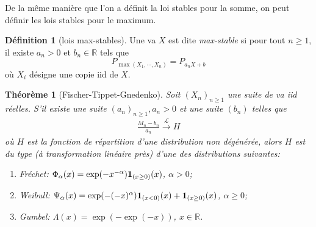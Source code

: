 \documentclass[10p,a4paper,reqno,titlepage]{report}
\newcommand{\R}{\mathbb{R}}
\newcommand{\indic}{\mathrm{{\bf 1}}}
\theoremstyle{plain}
\newtheorem{thm}[thms]{Théorème}
\theoremstyle{definition}
\newtheorem{de}[de]{Définition}
\newcommand{\cvloi}{\stackrel{\mathcal{L}}{\longrightarrow}}
\begin{document}
De la même manière que l'on a définit la loi stables pour la somme, on peut définir les lois stables pour le maximum.
\begin{de}[lois max-stables]
	Une va $X$ est dite \textit{max-stable} si pour tout $n \geq 1$, il existe $a_n >0$ et $b_n \in \R$ tels que 
	$$P_{\max(X_1,\cdots,X_n)} =P_{a_n X +b}$$
	où $X_i$ désigne une copie iid de $X$.
\end{de}
\begin{thm}[Fischer-Tippet-Gnedenko]
Soit $(X_n)_{n\geq 1}$ une suite de va iid réelles. S'il existe une suite $(a_n)_{n\geq 1}, a_n >0$ et une suite $(b_n)$ telles que 
\begin{align} \frac{M_n - b_n}{a_n} \cvloi H  \label{FTC}
\end{align}
où $H$ est la fonction de répartition d'une distribution non dégénérée, alors $H$ est du type (à transformation linéaire près) d'une des distributions suivantes:\
\begin{enumerate}
	\item Fréchet: $\Phi_\alpha (x)= \exp(-x^{-\alpha}) \indic_{(x\geq 0)} (x)$, $\alpha >0$;
	\item Weibull: $\Psi_\alpha (x) = \exp(-(-x)^\alpha) \indic_{(x<0)}(x) + \indic_{(x \geq 0)}(x)$, $\alpha \geq 0$;
	\item Gumbel: $\Lambda(x)= \exp(-\exp(-x))$, $x\in \R$.
\end{enumerate}
\end{thm}	
\end{document}
